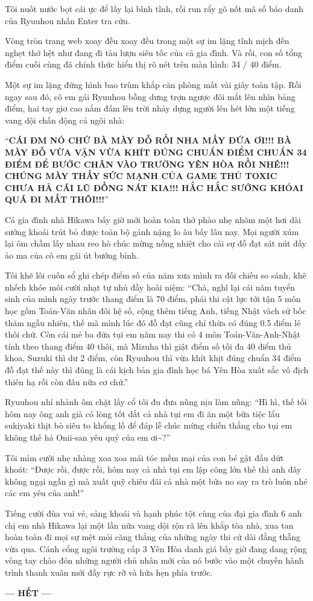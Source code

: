 \documentclass[../main.tex]{subfiles}
\begin{document}
Tôi nuốt nước bọt cái ực để lấy lại bình tĩnh, rồi run rẩy gõ nốt mã số báo danh của Ryuuhou nhấn Enter tra cứu.

Vòng tròn trang web xoay đều xoay đều trong một sự im lặng tĩnh mịch đến nghẹt thở hệt như đang đi tàu lượn siêu tốc của cả gia đình. Và rồi, con số tổng điểm cuối cùng đã chính thức hiển thị rõ nét trên màn hình: 34 / 40 điểm.

Một sự im lặng đứng hình bao trùm khắp căn phòng mất vài giây toàn tập. Rồi ngay sau đó, cô em gái Ryuuhou bỗng dưng trợn ngược đôi mắt lên nhìn bảng điểm, hai tay giơ cao nắm đấm lên trời nhảy dựng người lên hét lớn một tiếng vang dội chấn động cả ngôi nhà:

``\textbf{CÁI ĐM NÓ CHỨ BÀ MÀY ĐỖ RỒI NHA MẤY ĐỨA ƠI!!! BÀ MÀY ĐỖ VỪA VẶN VỪA KHÍT ĐÚNG CHUẨN ĐIỂM CHUẨN 34 ĐIỂM ĐỂ BƯỚC CHÂN VÀO TRƯỜNG YÊN HÒA RỒI NHÉ!!! CHÚNG MÀY THẤY SỨC MẠNH CỦA GAME THỦ TOXIC CHƯA HẢ CÁI LŨ ĐỒNG NÁT KIA!!! HẮC HẮC SƯỚNG KHÓAI QUÁ ĐI MẤT THÔI!!!}''

Cả gia đình nhà Hikawa bấy giờ mới hoàn toàn thở phào nhẹ nhõm một hơi dài sướng khoái trút bỏ được toàn bộ gánh nặng lo âu bấy lâu nay. Mọi người xúm lại ôm chầm lấy nhau reo hò chúc mừng nồng nhiệt cho cái sự đỗ đạt sát nút đầy ảo ma của cô em gái út bướng bỉnh.

Tôi khẽ lôi cuốn sổ ghi chép điểm số của năm xưa mình ra đối chiếu so sánh, khẽ nhếch khóe môi cười nhạt tự nhủ đầy hoài niệm: ``Chà, nghĩ lại cái năm tuyển sinh của mình ngày trước thang điểm là 70 điểm, phải thi cật lực tới tận 5 môn học gồm Toán-Văn nhân đôi hệ số, cộng thêm tiếng Anh, tiếng Nhật vàch sử bốc thăm ngẫu nhiên, thế mà mình lúc đó đỗ đạt cũng chỉ thừa có đúng 0.5 điểm lẻ thôi chứ. Còn cái mẻ ba đứa tụi em năm nay thi có 4 môn Toán-Văn-Anh-Nhật tính theo thang điểm 40 thôi, mà Mizuha thì giật điểm số tối đa 40 điểm thủ khoa, Suzuki thì dư 2 điểm, còn Ryuuhou thì vừa khít khịt đúng chuẩn 34 điểm đỗ đạt thế này thì đúng là cái kịch bản gia đình học bá Yên Hòa xuất sắc vô địch thiên hạ rồi còn đâu nữa cơ chứ.''

Ryuuhou nhí nhảnh ôm chặt lấy cổ tôi đu đưa nũng nịu làm nũng: ``Hì hì, thế tối hôm nay ông anh già có lòng tốt dắt cả nhà tụi em đi ăn một bữa tiệc lẩu sukiyaki thịt bò siêu to khổng lồ để đáp lễ chúc mừng chiến thắng cho tụi em không thế hả Onii-san yêu quý của em ơi\~{}?''

Tôi mỉm cười nhẹ nhàng xoa xoa mái tóc mềm mại của con bé gật đầu dứt khoát: ``Được rồi, được rồi, hôm nay cả nhà tụi em lập công lớn thế thì anh đây không ngại ngần gì mà xuất quỹ chiêu đãi cả nhà một bữa no say ra trò luôn nhé các em yêu của anh!''

Tiếng cười đùa vui vẻ, sảng khoái và hạnh phúc tột cùng của đại gia đình 6 anh chị em nhà Hikawa lại một lần nữa vang dội rộn rã lên khắp tòa nhà, xua tan hoàn toàn đi mọi sự mệt mỏi căng thẳng của những ngày thi cử dài đằng thẵng vừa qua. Cánh cổng ngôi trường cấp 3 Yên Hòa danh giá bấy giờ đang dang rộng vòng tay chào đón những người chủ nhân mới của nó bước vào một chuyến hành trình thanh xuân mới đầy rực rỡ và hứa hẹn phía trước.

\begin{center}
    \textbf{\Large --- HẾT ---}
\end{center}
\end{document}
